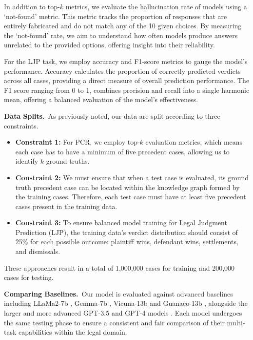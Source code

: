 In addition to top-$k$ metrics, we evaluate the hallucination rate of models using a `not-found' metric. This metric tracks the proportion of responses that are entirely fabricated and do not match any of the 10 given choices. By measuring the `not-found' rate, we aim to understand how often models produce answers unrelated to the provided options, offering insight into their reliability.

For the LJP task, we employ accuracy and F1-score \cite{sai2022survey} metrics to gauge the model's performance. Accuracy calculates the proportion of correctly predicted verdicts across all cases, providing a direct measure of overall prediction performance. The F1 score ranging from 0 to 1, combines precision and recall into a single harmonic mean, offering a balanced evaluation of the model's effectiveness.

\vspace{3pt}\noindent\textbf{Data Splits.}\,
\label{data_splits}
As previously noted, our data are split according to three constraints. 
\begin{itemize}
    \item \textbf{Constraint 1:} For PCR, we employ top-$k$ evaluation metrics, which means each case has to have a minimum of five precedent cases, allowing us to identify $k$ ground truths.

    \item \textbf{Constraint 2:} We must ensure that when a test case is evaluated, its ground truth precedent case can be located within the knowledge graph formed by the training cases. Therefore, each test case must have at least five precedent cases present in the training data. 
    \item \textbf{Constraint 3:} To ensure balanced model training for Legal Judgment Prediction (LJP), the training data's verdict distribution should consist of 25\% for each possible outcome: plaintiff wins, defendant wins, settlements, and dismissals.

\end{itemize}

These approaches result in a total of 1,000,000 cases for training and 200,000 cases for testing.

\vspace{3pt}\noindent\textbf{Comparing Baselines.}\,
Our model is evaluated against advanced baselines including LLaMa2-7b \cite{touvron2023llama}, Gemma-7b \cite{team2023gemini}, Vicuna-13b \cite{zheng2024judging} and Guanaco-13b \cite{dettmers2024qlora}, alongside the larger and more advanced GPT-3.5 and GPT-4 models \cite{achiam2023gpt}. Each model undergoes the same testing phase to ensure a consistent and fair comparison of their multi-task capabilities within the legal domain.

